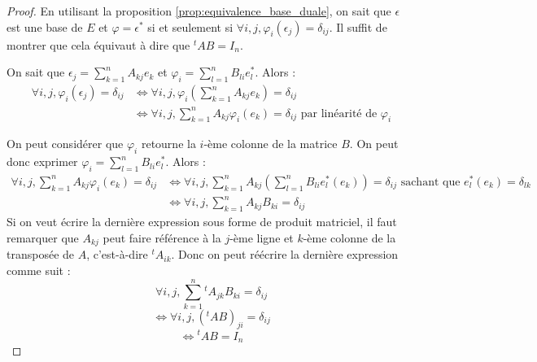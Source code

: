 \documentclass[11pt,a4paper]{report}
\begin{document}
\begin{proof}
    En utilisant la proposition \ref{prop:equivalence_base_duale}, on sait que $\epsilon$ est une base de $E$ et $\varphi = \epsilon^*$ si et seulement si $\forall i,j, \varphi_i(\epsilon_j) = \delta_{ij}$. Il suffit de montrer que cela équivaut à dire que $^tAB = I_n$.

    On sait que $\epsilon_j = \sum_{k=1}^n A_{kj} e_k$ et $\varphi_i = \sum_{l=1}^n B_{li} e_l^*$. Alors :
    \begin{align*}
        \forall i,j, \varphi_i(\epsilon_j) = \delta_{ij} &\iff \forall i,j, \varphi_i\left(\sum_{k=1}^n A_{kj} e_k\right) = \delta_{ij} \\
        &\iff \forall i,j, \sum_{k=1}^n A_{kj} \varphi_i(e_k) = \delta_{ij} \text{ par linéarité de } \varphi_i
    \end{align*}

    On peut considérer que $\varphi_i$ retourne la $i$-ème colonne de la matrice $B$. On peut donc exprimer $\varphi_i = \sum_{l=1}^n B_{li} e_l^*$. Alors :
    \begin{align*}
        \forall i,j, \sum_{k=1}^n A_{kj} \varphi_i(e_k) = \delta_{ij} &\iff \forall i,j, \sum_{k=1}^n A_{kj} \left(\sum_{l=1}^n B_{li} e_l^*(e_k)\right) = \delta_{ij} \text{ sachant que } e_l^*(e_k) = \delta_{lk} \\
        &\iff \forall i,j, \sum_{k=1}^n A_{kj} B_{ki} = \delta_{ij}
    \end{align*}
    Si on veut écrire la dernière expression sous forme de produit matriciel, il faut remarquer que $A_{kj}$ peut faire référence à la $j$-ème ligne et $k$-ème colonne de la transposée de $A$, c'est-à-dire $^tA_{ik}$. Donc on peut réécrire la dernière expression comme suit :
    $$\forall i,j, \sum_{k=1}^n {^tA}_{jk} B_{ki} = \delta_{ij}$$
    $$\iff \forall i,j, (^tAB)_{ji} = \delta_{ij}$$
    $$\iff \boxed{^tAB = I_n}$$
\end{proof}
\end{document}
